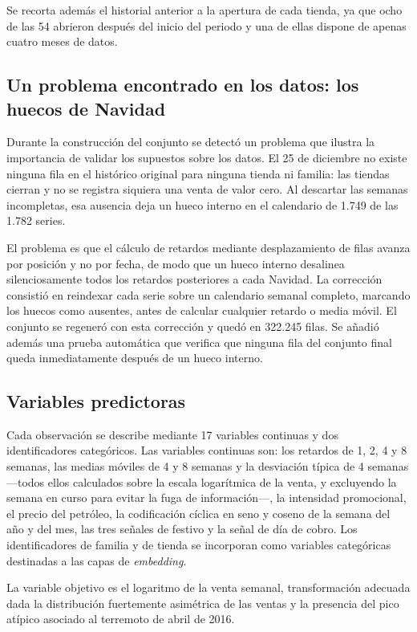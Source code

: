 Se recorta además el historial anterior a la apertura de cada tienda, ya que ocho de las 54 abrieron
después del inicio del periodo y una de ellas dispone de apenas cuatro meses de datos.

\subsection{Un problema encontrado en los datos: los huecos de Navidad}

Durante la construcción del conjunto se detectó un problema que ilustra la importancia de validar
los supuestos sobre los datos. El 25 de diciembre no existe ninguna fila en el histórico original
para ninguna tienda ni familia: las tiendas cierran y no se registra siquiera una venta de valor
cero. Al descartar las semanas incompletas, esa ausencia deja un hueco interno en el calendario de
1.749 de las 1.782 series.

El problema es que el cálculo de retardos mediante desplazamiento de filas avanza por posición y no
por fecha, de modo que un hueco interno desalinea silenciosamente todos los retardos posteriores a
cada Navidad. La corrección consistió en reindexar cada serie sobre un calendario semanal completo,
marcando los huecos como ausentes, antes de calcular cualquier retardo o media móvil. El conjunto se
regeneró con esta corrección y quedó en 322.245 filas. Se añadió además una prueba automática que
verifica que ninguna fila del conjunto final queda inmediatamente después de un hueco interno.

\subsection{Variables predictoras}

Cada observación se describe mediante 17 variables continuas y dos identificadores categóricos.
Las variables continuas son: los retardos de 1, 2, 4 y 8 semanas, las medias móviles de 4 y 8
semanas y la desviación típica de 4 semanas —todos ellos calculados sobre la escala logarítmica de
la venta, y excluyendo la semana en curso para evitar la fuga de información—, la intensidad
promocional, el precio del petróleo, la codificación cíclica en seno y coseno de la semana del año y
del mes, las tres señales de festivo y la señal de día de cobro. Los identificadores de familia y de
tienda se incorporan como variables categóricas destinadas a las capas de \emph{embedding}.

La variable objetivo es el logaritmo de la venta semanal, transformación adecuada dada la
distribución fuertemente asimétrica de las ventas y la presencia del pico atípico asociado al
terremoto de abril de 2016.

